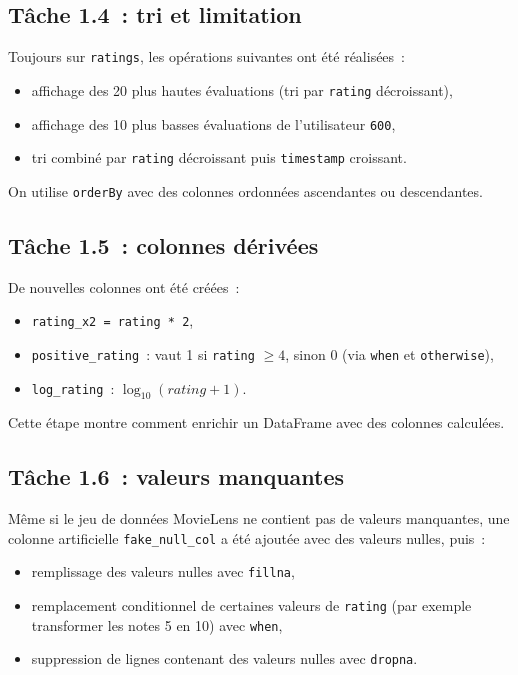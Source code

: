 \documentclass[a4paper,11pt]{article}
\begin{document}
\subsection{Tâche 1.4~: tri et limitation}

Toujours sur \texttt{ratings}, les opérations suivantes ont été réalisées~:
\begin{itemize}
  \item affichage des 20 plus hautes évaluations (tri par
        \texttt{rating} décroissant),
  \item affichage des 10 plus basses évaluations de l'utilisateur
        \texttt{600},
  \item tri combiné par \texttt{rating} décroissant puis
        \texttt{timestamp} croissant.
\end{itemize}

On utilise \texttt{orderBy} avec des colonnes ordonnées
ascendantes ou descendantes.

\subsection{Tâche 1.5~: colonnes dérivées}

De nouvelles colonnes ont été créées~:
\begin{itemize}
  \item \texttt{rating\_x2 = rating * 2},
  \item \texttt{positive\_rating}~: vaut 1 si \texttt{rating} $\geq 4$,
        sinon 0 (via \texttt{when} et \texttt{otherwise}),
  \item \texttt{log\_rating}~: $\log_{10}(rating + 1)$.
\end{itemize}

Cette étape montre comment enrichir un DataFrame avec des
colonnes calculées.

\subsection{Tâche 1.6~: valeurs manquantes}

Même si le jeu de données MovieLens ne contient pas de valeurs
manquantes, une colonne artificielle \texttt{fake\_null\_col} a
été ajoutée avec des valeurs nulles, puis~:
\begin{itemize}
  \item remplissage des valeurs nulles avec \texttt{fillna},
  \item remplacement conditionnel de certaines valeurs de \texttt{rating}
        (par exemple transformer les notes 5 en 10) avec \texttt{when},
  \item suppression de lignes contenant des valeurs nulles avec
        \texttt{dropna}.
\end{itemize}
\end{document}

